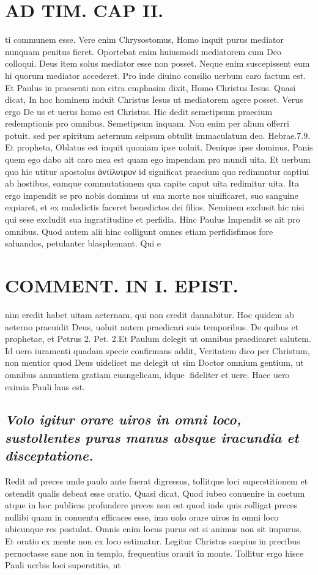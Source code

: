 \documentclass{article}
\begin{document}
\begin{pages}
\section*{AD TIM. CAP II. }
\marginpar{[ p.117 ]}\pstart ti communem esse. Vere enim Chrysostomus, Homo inquit purus mediator nunquam penitus fieret. Oportebat enim huiusmodi mediatorem cum Deo colloqui. Deus item solus mediator esse non posset. Neque enim suscepissent eum hi quorum mediator accederet. Pro inde diuino consilio uerbum caro factum est. Et Paulus in praesenti non citra emphasim dixit, Homo Christus Iesus. Quasi dicat, In hoc hominem induit Christus Iesus ut mediatorem agere posset. Verus ergo De us et uerus homo est Christus. Hic dedit semetipsum praecium redemptionis pro omnibus. Semetipsum inquam. Non enim per alium offerri potuit. sed per spiritum aeternum seipsum obtulit immaculatum deo. Hebrae.7.9. Et propheta, Oblatus est inquit quoniam ipse uoluit. Denique ipse dominus, Panis quem ego dabo ait caro mea est quam ego impendam pro mundi uita. Et uerbum quo hic utitur apostolus ἀντίλυτρον id significat praecium quo redimuntur captiui ab hostibus, eamque commutationem qua capite caput uita redimitur uita. Ita ergo impendit se pro nobis dominus ut sua morte nos uiuificaret, suo sanguine expiaret, et ex maledictis faceret benedictos dei filios. Neminem exclusit hic nisi qui sese excludit sua ingratitudine et perfidia. Hinc Paulus Impendit se ait pro omnibus. Quod autem alii hinc colligunt omnes etiam perfidisfimos fore saluandos, petulanter blasphemant. Qui e\pend
\section*{COMMENT. IN I. EPIST. }\pstart nim eredit habet uitam aeternam, qui non credit dannabitur. Hoc quidem ab aeterno praeuidit Deus, uoluit autem praedicari suis temporibus. De quibus et prophetae, et Petrus 2. Pet. 2.Et Paulum delegit ut omnibus praedicaret salutem. Id uero iuramenti quadam specie confirmans addit, Veritatem dico per Christum, non mentior quod Deus uidelicet me delegit ut sim Doctor omnium gentium, ut omnibus annuntiem gratiam euangelicam, idque fideliter et uere. Haec uero eximia Pauli laus est.  \pend 
{}
{}
\subsection*{\textit{Volo igitur orare uiros in omni loco, sustollentes puras manus absque iracundia et disceptatione. }}\pstart Redit ad preces unde paulo ante fuerat digressus, tollitque loci superstitionem et ostendit qualis debeat esse oratio. Quasi dicat, Quod iubeo conuenire in coetum atque in hoc publicas profundere preces non est quod inde quis colligat preces nullibi quam in conuentu efficaces esse, imo uolo orare uiros in omni loco ubicunque res postulat. Omnis enim locus purus est si animus non sit impurus. Et oratio ex mente non ex loco estimatur. Legitur Christus saepius in precibus pernoctasse sane non in templo, frequentius orauit in monte. Tollitur ergo hisce Pauli uerbis loci superstitio, ut  \pend

\end{pages}
\end{document}
